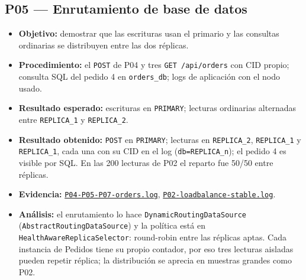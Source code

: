 \documentclass[
  spanish,
  a4paper,
  11pt
]{article}
\providecommand{\tightlist}{\setlength{\itemsep}{0pt}\setlength{\parskip}{0pt}}
\newcommand{\evid}[1]{\href{https://github.com/yan2005dris-afk/SDCC---microservices-with-gateway-and-loadbalancer/blob/develop/docs/evidencias/#1}{{\urlstyle{tt}\nolinkurl{#1}}}}
\begin{document}
\subsection{P05 --- Enrutamiento de base de datos}
\begin{itemize}
\tightlist
\item \textbf{Objetivo:} demostrar que las escrituras usan el primario y las consultas ordinarias se distribuyen entre las dos réplicas.
\item \textbf{Procedimiento:} el \texttt{POST} de P04 y tres \texttt{GET /api/orders} con CID propio; consulta SQL del pedido 4 en \texttt{orders\_db}; logs de aplicación con el nodo usado.
\item \textbf{Resultado esperado:} escrituras en \texttt{PRIMARY}; lecturas ordinarias alternadas entre \texttt{REPLICA\_1} y \texttt{REPLICA\_2}.
\item \textbf{Resultado obtenido:} \texttt{POST} en \texttt{PRIMARY}; lecturas en \texttt{REPLICA\_2}, \texttt{REPLICA\_1} y \texttt{REPLICA\_1}, cada una con su CID en el log (\texttt{db=REPLICA\_n}); el pedido 4 es visible por SQL. En las 200 lecturas de P02 el reparto fue 50/50 entre réplicas.
\item \textbf{Evidencia:} \evid{P04-P05-P07-orders.log}, \evid{P02-loadbalance-stable.log}.
\item \textbf{Análisis:} el enrutamiento lo hace \texttt{Dynamic\-Routing\-DataSource} (\texttt{Abstract\-Routing\-DataSource}) y la política está en \texttt{Health\-Aware\-Replica\-Selector}: round-robin entre las réplicas aptas. Cada instancia de Pedidos tiene su propio contador, por eso tres lecturas aisladas pueden repetir réplica; la distribución se aprecia en muestras grandes como P02.
\end{itemize}
\end{document}
